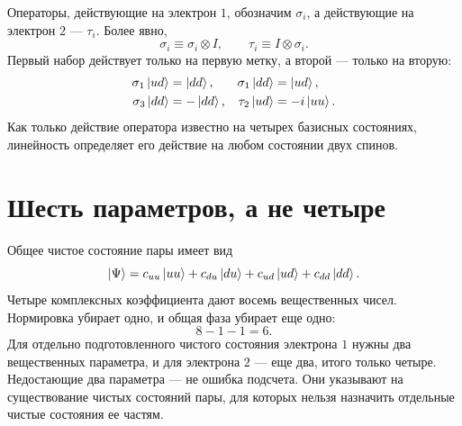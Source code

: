 Операторы, действующие на электрон \(1\), обозначим \(\sigma_i\), а действующие на электрон \(2\) — \(\tau_i\). Более явно,
\begin{equation}
  \sigma_i\equiv\sigma_i\otimes I,
  \qquad
  \tau_i\equiv I\otimes\sigma_i.
\end{equation}
Первый набор действует только на первую метку, а второй — только на вторую:
\begin{align}
  \sigma_1\left\lvert ud\right\rangle&=\left\lvert dd\right\rangle,
  &
  \sigma_1\left\lvert dd\right\rangle&=\left\lvert ud\right\rangle,
  \notag\\
  \sigma_3\left\lvert dd\right\rangle&=-\left\lvert dd\right\rangle,
  &
  \tau_2\left\lvert ud\right\rangle&=-i\left\lvert uu\right\rangle.
  \label{eq:l04-local-operator-examples}
\end{align}
Как только действие оператора известно на четырех базисных состояниях, линейность определяет его действие на любом состоянии двух спинов.

\begin{classroomqa}
\end{classroomqa}

\begin{classroomqa}
\end{classroomqa}

\section{Шесть параметров, а не четыре}

Общее чистое состояние пары имеет вид
\begin{equation}
  \left\lvert\Psi\right\rangle
  =
  c_{uu}\left\lvert uu\right\rangle
  +c_{du}\left\lvert du\right\rangle
  +c_{ud}\left\lvert ud\right\rangle
  +c_{dd}\left\lvert dd\right\rangle.
  \label{eq:l04-general-two-spin-state}
\end{equation}
Четыре комплексных коэффициента дают восемь вещественных чисел. Нормировка убирает одно, и общая фаза убирает еще одно:
\begin{equation}
  8-1-1=6.
  \label{eq:l04-two-spin-parameter-count}
\end{equation}
Для отдельно подготовленного чистого состояния электрона \(1\) нужны два вещественных параметра, и для электрона \(2\) — еще два, итого только четыре. Недостающие два параметра — не ошибка подсчета. Они указывают на существование чистых состояний пары, для которых нельзя назначить отдельные чистые состояния ее частям.

